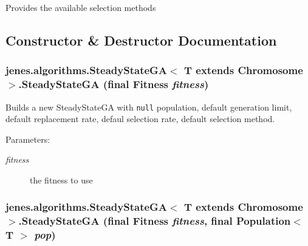 Provides the available selection methods 

\subsection{Constructor \& Destructor Documentation}
\hypertarget{classjenes_1_1algorithms_1_1_steady_state_g_a_3_01_t_01extends_01_chromosome_01_4_0bd9f9195ccd7bb9f0a93bf467ee81d5}{
\subsubsection[SteadyStateGA]{\setlength{\rightskip}{0pt plus 5cm}jenes.algorithms.SteadyStateGA$<$ T extends Chromosome $>$.SteadyStateGA (final Fitness {\em fitness})}}
\label{classjenes_1_1algorithms_1_1_steady_state_g_a_3_01_t_01extends_01_chromosome_01_4_0bd9f9195ccd7bb9f0a93bf467ee81d5}


Builds a new SteadyStateGA with {\tt null} population, default generation limit, default replacement rate, defaul selection rate, default selection method.

\begin{Desc}
\item[Parameters:]
\begin{description}
\item[{\em fitness}]the fitness to use \end{description}
\end{Desc}
\hypertarget{classjenes_1_1algorithms_1_1_steady_state_g_a_3_01_t_01extends_01_chromosome_01_4_1fab107de8499953af703b619d2fc741}{
\subsubsection[SteadyStateGA]{\setlength{\rightskip}{0pt plus 5cm}jenes.algorithms.SteadyStateGA$<$ T extends Chromosome $>$.SteadyStateGA (final Fitness {\em fitness}, \/  final Population$<$ T $>$ {\em pop})}}
\label{classjenes_1_1algorithms_1_1_steady_state_g_a_3_01_t_01extends_01_chromosome_01_4_1fab107de8499953af703b619d2fc741}


